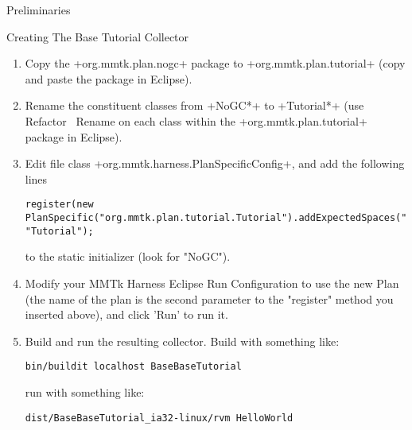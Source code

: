 \begin{chapter}{Preliminaries}
\begin{section}{Creating The Base Tutorial Collector}
\begin{enumerate}
  \item Copy the \spverb+org.mmtk.plan.nogc+ package to \spverb+org.mmtk.plan.tutorial+ (copy and paste the package in Eclipse).
  \item Rename the constituent classes from \spverb+NoGC*+ to \spverb+Tutorial*+ (use Refactor \textrightarrow\ Rename on each class within the \spverb+org.mmtk.plan.tutorial+ package in Eclipse).
  \item Edit file class \spverb+org.mmtk.harness.PlanSpecificConfig+, and add the following lines 
     \begin{lstlisting}
register(new PlanSpecific("org.mmtk.plan.tutorial.Tutorial").addExpectedSpaces("default"), "Tutorial");
     \end{lstlisting}
to the static initializer (look for "NoGC").
  \item Modify your MMTk Harness Eclipse Run Configuration to use the new Plan (the name of the plan is the second parameter to the "register" method you inserted above), and click 'Run' to run it.
  \item Build and run the resulting collector. \newline Build with something like:
    \begin{lstlisting}
bin/buildit localhost BaseBaseTutorial
    \end{lstlisting}
    run with something like:
    \begin{lstlisting}
dist/BaseBaseTutorial_ia32-linux/rvm HelloWorld
    \end{lstlisting}
\end{enumerate}

\end{section}

\end{chapter}
